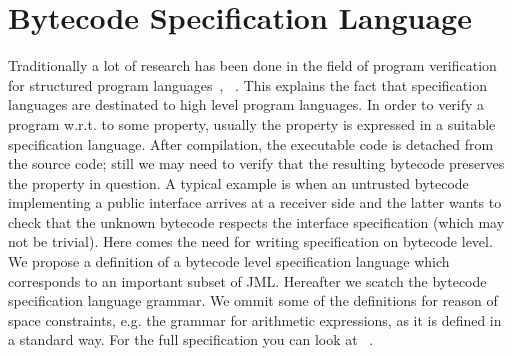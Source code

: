 
\section{Bytecode Specification Language}\label{bcSpecLg}
Traditionally a lot of research has been done in the field of program verification for structured program languages~\cite{WPCDS},
~\cite{DisDij}. This explains the fact that specification languages are destinated to high level program languages. In order to verify 
a program w.r.t. to some property, usually the property is expressed in a suitable specification language.
After compilation, the executable code is detached from the source code; still we may need to verify that the resulting bytecode 
preserves the property in question. A typical example is when an untrusted bytecode implementing a public interface arrives at a 
receiver side and the latter wants to check that the 
unknown  bytecode respects the interface specification (which may not be trivial). Here comes the need for writing specification on 
bytecode level. We propose a definition of a bytecode level specification language which corresponds to an important subset of JML.
Hereafter we scatch the bytecode specification language grammar. We ommit some of the definitions for reason of space constraints,
 e.g. the grammar for arithmetic expressions, as it is defined in a standard way. For the full specification you can look at ~\cite{JML2BCSpec}.  

